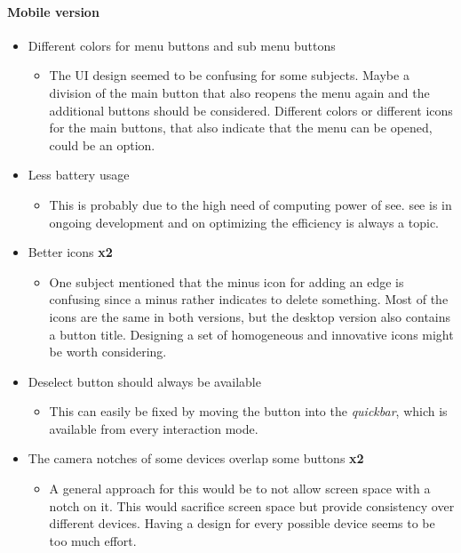 \paragraph{Mobile version}
\begin{itemize}
  \item Different colors for menu buttons and sub menu buttons 
  \begin{itemize}
    \item The UI design seemed to be confusing for some subjects. 
    Maybe a division of the main button that also reopens the menu again and the additional buttons should be considered. 
    Different colors or different icons for the main buttons, that also indicate that the menu can be opened, could be an option. 
  \end{itemize}
  \item Less battery usage
  \begin{itemize}
    \item This is probably due to the high need of computing power of \gls{see}. \gls{see} is in ongoing development and on optimizing the efficiency is always a topic. 
  \end{itemize}
  \item Better icons \textbf{x2}
  \begin{itemize}
    \item One subject mentioned that the minus icon for adding an edge is confusing since a minus rather indicates to delete something. 
    Most of the icons are the same in both versions, but the desktop version also contains a button title. 
    Designing a set of homogeneous and innovative icons might be worth considering.
  \end{itemize}
  \item Deselect button should always be available 
  \begin{itemize}
    \item This can easily be fixed by moving the button into the \textit{quickbar}, which is available from every interaction mode.
  \end{itemize}
  \item The camera notches of some devices overlap some buttons \textbf{x2}
  \begin{itemize}
    \item A general approach for this would be to not allow screen space with a notch on it. 
    This would sacrifice screen space but provide consistency over different devices. 
    Having a design for every possible device seems to be too much effort.

\end{itemize}
\end{itemize}
